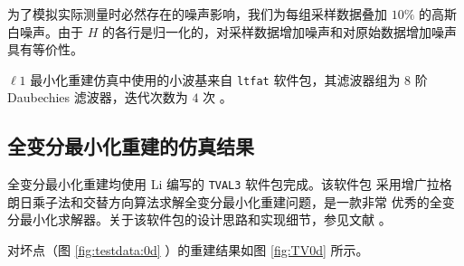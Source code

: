 为了模拟实际测量时必然存在的噪声影响，我们为每组采样数据叠加 $10\%$ 的高斯
白噪声。由于 $H$ 的各行是归一化的，对采样数据增加噪声和对原始数据增加噪声
具有等价性。

$\ell1$ 最小化重建仿真中使用的小波基来自 \verb|ltfat| 软件包，其滤波器组为
$8$ 阶 Daubechies 滤波器，迭代次数为 $4$ 次\cite{ltfatnote015} 
\cite{ltfatnote030} 。

\subsection{全变分最小化重建的仿真结果}

全变分最小化重建均使用 Li 编写的 \verb|TVAL3| 软件包完成。该软件包
采用增广拉格朗日乘子法和交替方向算法求解全变分最小化重建问题，是一款非常
优秀的全变分最小化求解器。关于该软件包的设计思路和实现细节，参见文献
\cite{TVAL3CBLMaster} \cite{TVAL3CBLPhD}。

对坏点（图 \ref{fig:testdata:0d} ）的重建结果如图 \ref{fig:TV0d} 所示。

